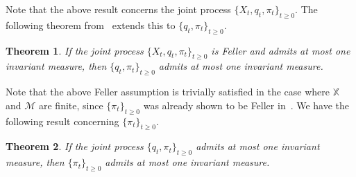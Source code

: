 \documentclass{article}
\newtheorem{theorem}{Theorem}[section]
\begin{document}
Note that the above result concerns the joint process \( \{X_t,q_t,\pi_t \}_{t\ge0} \). The following theorem from~\cite{Stettner} extends this to \( \{q_t,\pi_t \}_{t\ge0} \).

\begin{theorem}\label{theorem:3.2}\cite[Theorem 3]{Stettner}
    If the joint process \( \{X_t,q_t,\pi_t \}_{t\ge0} \) is Feller and admits at most one invariant measure, then \( \{q_t, \pi_t\}_{t\ge0} \) admits at most one invariant measure.
\end{theorem}

Note that the above Feller assumption is trivially satisfied in the case where \( \mathbb{X} \) and \( \mathcal{M} \) are finite, since \( \{\pi_t\}_{t\ge0} \) was already shown to be Feller in~\cite{Linder}. We have the following result concerning \( \{\pi_t\}_{t\ge0} \).

\begin{theorem}\label{theorem:3.3}
    If the joint process \( \{q_t, \pi_t\}_{t\ge0} \) admits at most one invariant measure, then \( \{\pi_t\}_{t\ge0} \) admits at most one invariant measure.
\end{theorem}
\end{document}
